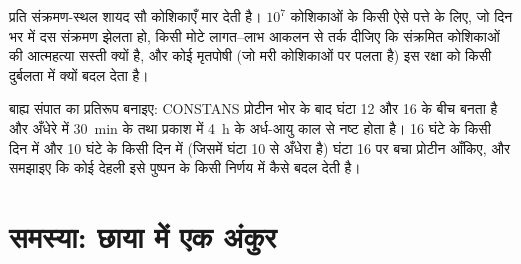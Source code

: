 \begin{exercise}[$\star\star\star$]\label{exo:b3:plant-molecular-physiology:11}
 प्रति संक्रमण-स्थल शायद सौ कोशिकाएँ मार देती है।
$10^{7}$ कोशिकाओं के किसी ऐसे पत्ते के लिए, जो दिन भर में दस संक्रमण
झेलता हो, किसी मोटे लागत--लाभ आकलन से तर्क दीजिए कि संक्रमित कोशिकाओं
की आत्महत्या सस्ती क्यों है, और कोई मृतपोषी (जो मरी कोशिकाओं पर पलता
है) इस रक्षा को किसी दुर्बलता में क्यों बदल देता है।
\end{exercise}

\begin{exercise}[$\star\star\star$]\label{exo:b3:plant-molecular-physiology:12}
बाह्य संपात का प्रतिरूप बनाइए: CONSTANS प्रोटीन भोर के बाद घंटा 12 और
16 के बीच बनता है और अँधेरे में \qty{30}{min} के तथा प्रकाश में
\qty{4}{h} के अर्ध-आयु काल से नष्ट होता है। 16 घंटे के किसी दिन में और
10 घंटे के किसी दिन में (जिसमें घंटा 10 से अँधेरा है) घंटा 16 पर बचा
प्रोटीन आँकिए, और समझाइए कि कोई देहली इसे पुष्पन के किसी निर्णय में कैसे
बदल देती है।
\end{exercise}

\section{समस्या: छाया में एक अंकुर}

